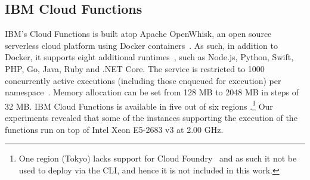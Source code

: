 
\subsection{IBM Cloud Functions}\label{sec:ss:ibm}

\gls{IBM}'s Cloud Functions \cite{IBMFunctions} is built atop Apache OpenWhisk, an open source serverless cloud platform using Docker containers~\cite{OpenWhisk}. 
As such, in addition to Docker, it supports eight additional runtimes~\cite{IBMRuntimes}, such as Node.js, Python, Swift, PHP, Go, Java, Ruby and .NET Core.
The service is restricted to 1000 concurrently active executions (including those enqueued for execution) per namespace~\cite{IBMLimits}. 
Memory allocation can be set from 128 \gls{MB} to 2048 \gls{MB} in steps of 32 \gls{MB}. 
\gls{IBM} Cloud Functions is available in five out of six regions \cite{IBMLocations}.\footnote{One region (Tokyo) lacks support for Cloud Foundry~\cite{IBMCloudFoundry} and as such it not be used to deploy via the \gls{CLI}, and hence it is not included in this work.} 
Our experiments revealed that some of the  instances supporting the execution of the functions run on top of Intel Xeon E5-2683 v3 at 2.00 \gls{GHz}.



